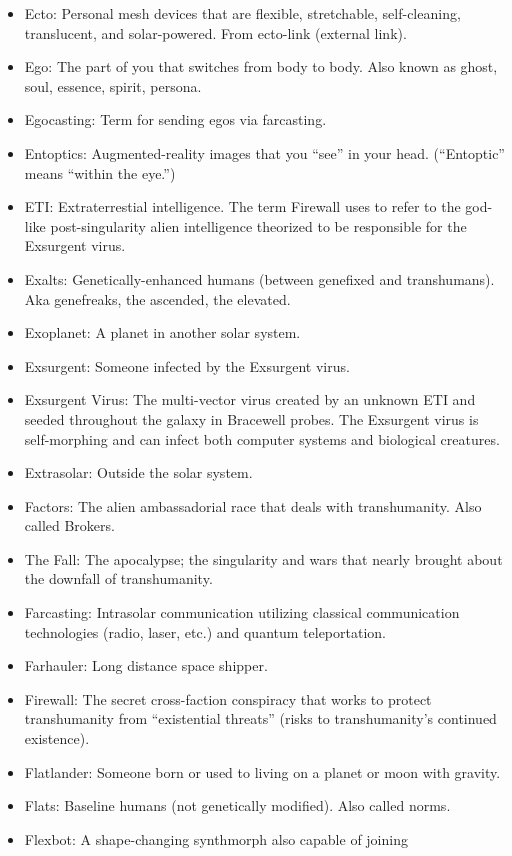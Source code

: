 \begin{itemize}
\item Ecto: Personal mesh devices that are flexible, stretchable,
  self-cleaning, translucent, and solar-powered. From ecto-link
  (external link).
\item Ego: The part of you that switches from body to body.  Also
  known as ghost, soul, essence, spirit, persona.
\item Egocasting: Term for sending egos via farcasting.
\item Entoptics: Augmented-reality images that you ``see'' in your
  head. (``Entoptic'' means ``within the eye.'')
\item ETI: Extraterrestial intelligence. The term Firewall uses to
  refer to the god-like post-singularity alien intelligence theorized
  to be responsible for the Exsurgent virus.
\item Exalts: Genetically-enhanced humans (between genefixed and
  transhumans). Aka genefreaks, the ascended, the elevated.
\item Exoplanet: A planet in another solar system.
\item Exsurgent: Someone infected by the Exsurgent virus.
\item Exsurgent Virus: The multi-vector virus created by an unknown
  ETI and seeded throughout the galaxy in Bracewell probes. The
  Exsurgent virus is self-morphing and can infect both computer
  systems and biological creatures.
\item Extrasolar: Outside the solar system.
\item Factors: The alien ambassadorial race that deals with
  transhumanity. Also called Brokers.
\item The Fall: The apocalypse; the singularity and wars that nearly
  brought about the downfall of transhumanity.
\item Farcasting: Intrasolar communication utilizing classical
  communication technologies (radio, laser, etc.) and quantum
  teleportation.
\item Farhauler: Long distance space shipper.
\item Firewall: The secret cross-faction conspiracy that works to
  protect transhumanity from ``existential threats'' (risks to
  transhumanity's continued existence).
\item Flatlander: Someone born or used to living on a planet or moon
  with gravity.
\item Flats: Baseline humans (not genetically modified). Also called
  norms.
\item Flexbot: A shape-changing synthmorph also capable of joining

\end{itemize}
